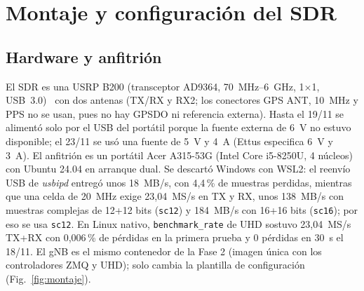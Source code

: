\documentclass[conference]{IEEEtran}
\begin{document}
\section{Montaje y configuración del SDR}
\label{sec:sdr}

\subsection{Hardware y anfitrión}
El SDR es una USRP B200 (transceptor AD9364, 70~MHz--6~GHz, 1$\times$1, USB~3.0)~\cite{uhd} con dos antenas (TX/RX y RX2; los conectores GPS ANT, 10~MHz y PPS no se usan, pues no hay GPSDO ni referencia externa). Hasta el 19/11 se alimentó solo por el USB del portátil porque la fuente externa de 6~V no estuvo disponible; el 23/11 se usó una fuente de 5~V y 4~A (Ettus especifica 6~V y 3~A). El anfitrión es un portátil Acer A315-53G (Intel Core i5-8250U, 4 núcleos) con Ubuntu 24.04 en arranque dual. Se descartó Windows con WSL2: el reenvío USB de \textit{usbipd} entregó unos 18~MB/s, con 4{,}4\,\% de muestras perdidas, mientras que una celda de 20~MHz exige 23{,}04~MS/s en TX y RX, unos 138~MB/s con muestras complejas de 12+12 bits (\texttt{sc12}) y 184~MB/s con 16+16 bits (\texttt{sc16}); por eso se usa \texttt{sc12}. En Linux nativo, \texttt{benchmark\_rate} de UHD sostuvo 23{,}04~MS/s TX+RX con 0{,}006\,\% de pérdidas en la primera prueba y 0 pérdidas en 30~s el 18/11. El gNB es el mismo contenedor de la Fase 2 (imagen única con los controladores ZMQ y UHD); solo cambia la plantilla de configuración (Fig.~\ref{fig:montaje}).
\end{document}
